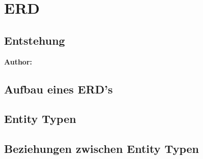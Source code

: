 \chapter{ERD}
\label{cha:Einleitung}



\section{Entstehung}

\textbf{Author:} 

\section{Aufbau eines ERD's}

\section{Entity Typen}

\section{Beziehungen zwischen Entity Typen}

